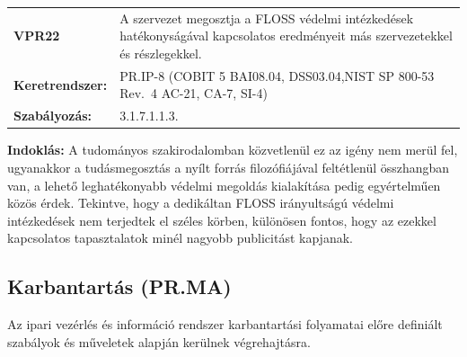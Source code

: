 \documentclass[12pt,magyar,a4paper,oneside]{scrreprt}
\begin{document}
\begin{longtable}[]{@{}ll@{}}
\toprule
\endhead
\begin{minipage}[t]{0.16\columnwidth}\raggedright
\textbf{VPR22}\strut
\end{minipage} & \begin{minipage}[t]{0.79\columnwidth}\raggedright
A szervezet megosztja a FLOSS védelmi intézkedések hatékonyságával
kapcsolatos eredményeit más szervezetekkel és részlegekkel.\strut
\end{minipage}\tabularnewline
\begin{minipage}[t]{0.16\columnwidth}\raggedright
\textbf{Keretrendszer:}\strut
\end{minipage} & \begin{minipage}[t]{0.79\columnwidth}\raggedright
PR.IP-8 (COBIT 5 BAI08.04, DSS03.04,NIST SP 800-53 Rev.~4 AC-21, CA-7,
SI-4)\strut
\end{minipage}\tabularnewline
\begin{minipage}[t]{0.16\columnwidth}\raggedright
\textbf{Szabályozás:}\strut
\end{minipage} & \begin{minipage}[t]{0.79\columnwidth}\raggedright
3.1.7.1.1.3.\strut
\end{minipage}\tabularnewline
\bottomrule
\end{longtable}

\textbf{Indoklás: } A tudományos szakirodalomban közvetlenül ez az igény
nem merül fel, ugyanakkor a tudásmegosztás a nyílt forrás filozófiájával
feltétlenül összhangban van, a lehető leghatékonyabb védelmi megoldás
kialakítása pedig egyértelműen közös érdek. Tekintve, hogy a dedikáltan
FLOSS irányultságú védelmi intézkedések nem terjedtek el széles körben,
különösen fontos, hogy az ezekkel kapcsolatos tapasztalatok minél
nagyobb publicitást kapjanak.

\hypertarget{karbantartuxe1s-pr.ma}{%
\subsection{Karbantartás (PR.MA)}\label{karbantartuxe1s-pr.ma}}

Az ipari vezérlés és információ rendszer karbantartási folyamatai előre
definiált szabályok és műveletek alapján kerülnek végrehajtásra.
\end{document}

